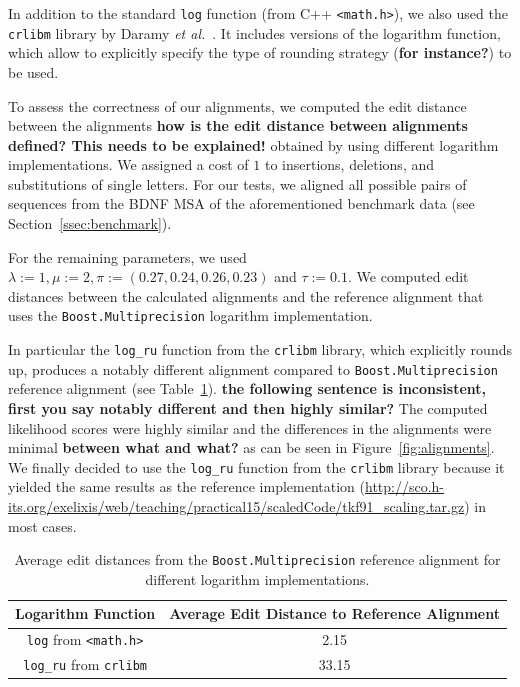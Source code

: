 \documentclass[runningheads,a4paper]{llncs}
\begin{document}
In addition to the standard \texttt{log} function (from C++ \texttt{<math.h>}), 
we also used the \texttt{crlibm} library by Daramy {\em et al.}~\cite{Daramy04}. 
It includes versions of the logarithm function, which allow to explicitly specify the type of rounding strategy ({\bf for instance?}) to be used.

To assess the correctness of our alignments, we computed the edit distance between the alignments {\bf how is the edit distance between alignments defined? This needs to be explained!} 
obtained by using different logarithm implementations. 
We assigned a cost of $1$ to insertions, deletions, and substitutions of single letters. 
For our tests, we aligned all possible pairs of sequences from the BDNF MSA of the aforementioned benchmark data (see Section~\ref{ssec:benchmark}).

For the remaining parameters, we used $\lambda:=1, \mu:=2, \pi:= (0.27, 0.24, 0.26,0.23)$ and $\tau := 0.1$. 
We computed edit distances between the calculated alignments and the reference alignment that uses the \texttt{Boost.Multiprecision} logarithm implementation. 

In particular the \texttt{log\_ru} function from the \texttt{crlibm} library, which explicitly rounds up, produces a notably different alignment compared to 
\texttt{Boost.Multiprecision} reference alignment (see Table~\ref{fig:dist}). 
{\bf the following sentence is inconsistent, first you say notably different and then highly similar?} 
The computed likelihood scores were highly similar and the differences in the alignments were minimal {\bf between what and what?} as can be seen in Figure~\ref{fig:alignments}. 
We finally decided to use the \texttt{log\_ru} function from the \texttt{crlibm} library because it yielded the same results as the reference implementation 
(\url{http://sco.h-its.org/exelixis/web/teaching/practical15/scaledCode/tkf91_scaling.tar.gz}) in most cases.

\begin{table}[h!]

\centering

\begin{tabular}{|c|c|}
\hline 
Logarithm Function & Average Edit Distance to Reference Alignment\\ 
\hline 
\texttt{log} from \texttt{<math.h>} & 2.15 \\ 
\hline 
\texttt{log\_ru} from \texttt{crlibm} & 33.15 \\ 
\hline 
\end{tabular} 
\caption{Average edit distances from the \texttt{Boost.Multiprecision} reference alignment for different logarithm implementations.}
\label{fig:dist}
\end{table}
\end{document}
